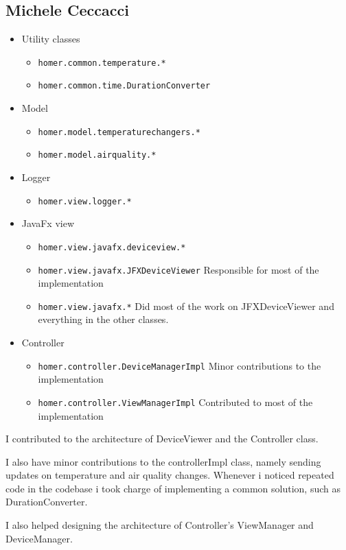 \subsection{Michele Ceccacci}

\begin{itemize}
    \item Utility classes
    \begin{itemize}
        \item \texttt{homer.common.temperature.*} 
		\item \texttt{homer.common.time.DurationConverter}
    \end{itemize}
	\item Model
	\begin{itemize}
		\item \texttt{homer.model.temperaturechangers.*}
		\item \texttt{homer.model.airquality.*}
	\end{itemize}
	\item Logger
	\begin{itemize}
		\item \texttt{homer.view.logger.*}
	\end{itemize}
	\item JavaFx view
	\begin{itemize}
		\item \texttt{homer.view.javafx.deviceview.*}
		\item \texttt{homer.view.javafx.JFXDeviceViewer} Responsible for most of the implementation
		\item \texttt{homer.view.javafx.*} Did most of the work on JFXDeviceViewer and everything in the other classes.
	\end{itemize}
	\item Controller 
	\begin{itemize}
		\item \texttt{homer.controller.DeviceManagerImpl} Minor contributions to the implementation
		\item \texttt{homer.controller.ViewManagerImpl} Contributed to most of the implementation
	\end{itemize}

\end{itemize}

I contributed to the architecture of DeviceViewer and the Controller class.

I also have minor contributions to the controllerImpl class, namely sending updates on temperature and air quality changes.
Whenever i noticed repeated code in the codebase i took charge of implementing a common solution, such as DurationConverter.

I also helped designing the architecture of Controller's ViewManager and DeviceManager.
